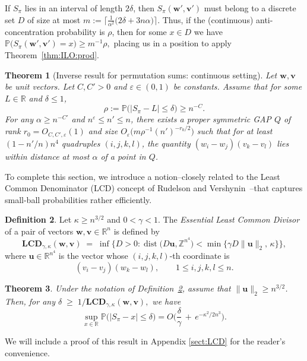 \documentclass[reqno]{amsart}
\newcommand\R{{\mathbb{R}}}
\newcommand\Z{{\mathbb{Z}}}
\renewcommand\P{{\mathbb{P}}}
\newcommand\eps{{\varepsilon}}
\newcommand\dist{\operatorname{dist}}
\newcommand\BMu{{\bm u}}
\newcommand\BMv{{\bm v}}
\newcommand\BMw{{\bm w}}
\newcommand\LCD{\mathbf{LCD}}
\theoremstyle{plain}
\newtheorem{theorem}{Theorem}[section]
\theoremstyle{definition}
\newtheorem{definition}[theorem]{Definition}
\begin{document}
If $S_{\pi}$ lies in an interval of length $2\delta$, then
$S_{\pi}(\BMw',\BMv')$ must belong to a discrete set $D$ of size at most
\(
m := \Big\lceil \frac{1}{\alpha^2}\bigl(2\delta+3n\alpha\bigr)\Big\rceil.
\)
Thus, if the (continuous) anti-concentration probability is $\rho$, then for
some $x\in D$ we have
\(
\P\bigl(S_{\pi}(\BMw',\BMv')=x\bigr)\ge m^{-1}\rho,
\)
placing us in a position to apply Theorem~\ref{thm:ILO:prod}.

\begin{theorem}[Inverse result for permutation sums: continuous setting]
\label{thm:ILO:prod1}
Let $\BMw,\BMv$ be unit vectors. Let $C,C'>0$ and $\varepsilon\in(0,1)$ be
constants. Assume that for some $L\in\R$ and $\delta\le1$,
\[
\rho := \P\bigl(|S_{\pi}-L|\le\delta\bigr)\ge n^{-C}.
\]
For any $\alpha\ge n^{-C'}$ and $n^{\eps}\le n'\le n$, there exists a proper symmetric GAP $Q$ of rank
$r_0=O_{C,C',\eps}(1)$ and size
$O_{\eps}\bigl(m\rho^{-1}(n')^{-r_0/2}\bigr)$ such that for at least
$(1-n'/n)n^4$ quadruples $(i,j,k,l)$, the quantity
$(w_i-w_j)(v_k-v_l)$ lies within distance at most $\alpha$ of a point in $Q$.
\end{theorem}

To complete this section, we introduce a notion--closely related to the Least Common Denominator (LCD) concept of Rudelson and Vershynin~\cite{RV}--that captures small-ball probabilities rather efficiently.

\begin{definition}\label{defn:LCD}  
Let $\kappa \ge n^{3/2}$ and $0 < \gamma < 1$. The \emph{Essential Least Common Divisor} of a pair of vectors $\BMw, \BMv \in \R^n$ is defined by  
\[
\LCD_{\gamma, \kappa} (\BMw, \BMv)
\;=\;
\inf\Big\{ D > 0 \colon \dist\big(D \BMu, \Z^{n^4}\big)
< \min\{\gamma D \|\BMu\|_{2}, \, \kappa\} \Big\},
\]  
where $\BMu \in \R^{n^4}$ is the vector whose $(i,j,k,l)$-th coordinate is
\[
(v_{i} - v_{j})(w_{k} - w_{l}), \qquad 1\le i,j,k,l\le n.
\]
\end{definition}

\begin{theorem}\cite[Theorem~3.2]{Tran}\label{thm:LCD}  
Under the notation of Definition~\ref{defn:LCD}, assume that $\|\BMu\|_{2} \ge n^{3/2}$. Then, for any
\(
\delta \;\ge\; 1/\LCD_{\gamma, \kappa} (\BMw, \BMv),
\)
we have
\[
\sup_{x \in \R} \P\big( |S_{\pi} - x| \le \delta \big)
=
O\Big(\frac{\delta}{\gamma} \,+\, e^{-\kappa^{2} / 2n^{3}}\Big).
\]
\end{theorem}

We will include a proof of this result in Appendix \ref{sect:LCD} for the reader's convenience.
\end{document}
